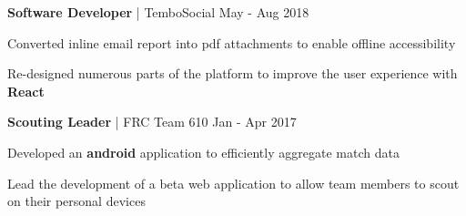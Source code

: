 \begin{cventries}

\cventry
{\textbf{Software Developer} | TemboSocial}
{May - Aug 2018} %
{ %
\begin{cvitems}
\item {Converted inline email report into pdf attachments to enable offline accessibility}
\item {Re-designed numerous parts of the platform to improve the user experience with \textbf{React}}
\end{cvitems}
}


\cventry
{\textbf{Scouting Leader} | FRC Team 610}
{Jan - Apr 2017} %
{ %
\begin{cvitems}
\item {Developed an \textbf{android} application to efficiently aggregate match data}
\item {Lead the development of a beta web application to allow team members to scout on their personal devices}
\end{cvitems}
}


\end{cventries}